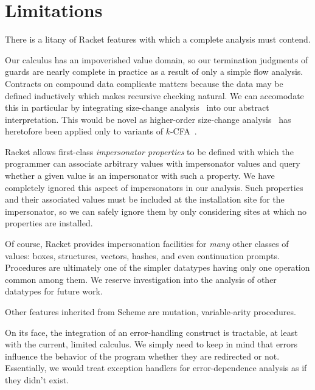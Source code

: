 \section{Limitations}
\label{sec:limitations}

There is a litany of Racket features with which a complete analysis must contend.

Our calculus has an impoverished value domain, so our termination judgments of guards are nearly complete in practice as a result of only a simple flow analysis.
Contracts on compound data complicate matters because the data may be defined inductively which makes recursive checking natural.
We can accomodate this in particular by integrating size-change analysis~\cite{lee2001size} into our abstract interpretation.
This would be novel as higher-order size-change analysis~\cite{sereni2007termination} has heretofore been applied only to variants of $k$-CFA~\cite{shivers1991control}.

Racket allows first-class \emph{impersonator properties} to be defined with which the programmer can associate arbitrary values with impersonator values and query whether a given value is an impersonator with such a property.
We have completely ignored this aspect of impersonators in our analysis.
Such properties and their associated values must be included at the installation site for the impersonator, so we can safely ignore them by only considering sites at which no properties are installed.

Of course, Racket provides impersonation facilities for \emph{many} other classes of values: boxes, structures, vectors, hashes, and even continuation prompts.
Procedures are ultimately one of the simpler datatypes having only one operation common among them.
We reserve investigation into the analysis of other datatypes for future work.

Other features inherited from Scheme are mutation, variable-arity procedures.

On its face, the integration of an error-handling construct is tractable, at least with the current, limited calculus.
We simply need to keep in mind that errors influence the behavior of the program whether they are redirected or not.
Essentially, we would treat exception handlers for error-dependence analysis as if they didn't exist.




